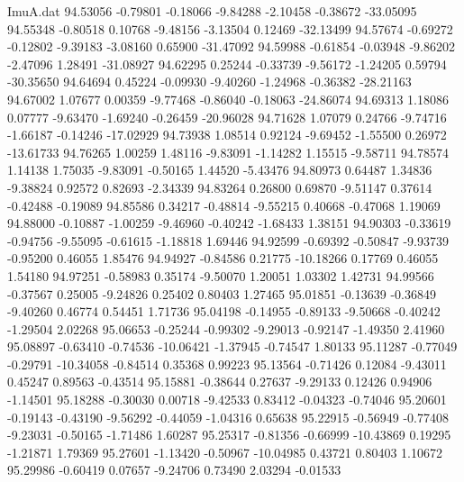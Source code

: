 \begin{filecontents}{ImuA.dat}
  94.53056   -0.79801   -0.18066   -9.84288   -2.10458   -0.38672  -33.05095
  94.55348   -0.80518    0.10768   -9.48156   -3.13504    0.12469  -32.13499
  94.57674   -0.69272   -0.12802   -9.39183   -3.08160    0.65900  -31.47092
  94.59988   -0.61854   -0.03948   -9.86202   -2.47096    1.28491  -31.08927
  94.62295    0.25244   -0.33739   -9.56172   -1.24205    0.59794  -30.35650
  94.64694    0.45224   -0.09930   -9.40260   -1.24968   -0.36382  -28.21163
  94.67002    1.07677    0.00359   -9.77468   -0.86040   -0.18063  -24.86074
  94.69313    1.18086    0.07777   -9.63470   -1.69240   -0.26459  -20.96028
  94.71628    1.07079    0.24766   -9.74716   -1.66187   -0.14246  -17.02929
  94.73938    1.08514    0.92124   -9.69452   -1.55500    0.26972  -13.61733
  94.76265    1.00259    1.48116   -9.83091   -1.14282    1.15515   -9.58711
  94.78574    1.14138    1.75035   -9.83091   -0.50165    1.44520   -5.43476
  94.80973    0.64487    1.34836   -9.38824    0.92572    0.82693   -2.34339
  94.83264    0.26800    0.69870   -9.51147    0.37614   -0.42488   -0.19089
  94.85586    0.34217   -0.48814   -9.55215    0.40668   -0.47068    1.19069
  94.88000   -0.10887   -1.00259   -9.46960   -0.40242   -1.68433    1.38151
  94.90303   -0.33619   -0.94756   -9.55095   -0.61615   -1.18818    1.69446
  94.92599   -0.69392   -0.50847   -9.93739   -0.95200    0.46055    1.85476
  94.94927   -0.84586    0.21775  -10.18266    0.17769    0.46055    1.54180
  94.97251   -0.58983    0.35174   -9.50070    1.20051    1.03302    1.42731
  94.99566   -0.37567    0.25005   -9.24826    0.25402    0.80403    1.27465
  95.01851   -0.13639   -0.36849   -9.40260    0.46774    0.54451    1.71736
  95.04198   -0.14955   -0.89133   -9.50668   -0.40242   -1.29504    2.02268
  95.06653   -0.25244   -0.99302   -9.29013   -0.92147   -1.49350    2.41960
  95.08897   -0.63410   -0.74536  -10.06421   -1.37945   -0.74547    1.80133
  95.11287   -0.77049   -0.29791  -10.34058   -0.84514    0.35368    0.99223
  95.13564   -0.71426    0.12084   -9.43011    0.45247    0.89563   -0.43514
  95.15881   -0.38644    0.27637   -9.29133    0.12426    0.94906   -1.14501
  95.18288   -0.30030    0.00718   -9.42533    0.83412   -0.04323   -0.74046
  95.20601   -0.19143   -0.43190   -9.56292   -0.44059   -1.04316    0.65638
  95.22915   -0.56949   -0.77408   -9.23031   -0.50165   -1.71486    1.60287
  95.25317   -0.81356   -0.66999  -10.43869    0.19295   -1.21871    1.79369
  95.27601   -1.13420   -0.50967  -10.04985    0.43721    0.80403    1.10672
  95.29986   -0.60419    0.07657   -9.24706    0.73490    2.03294   -0.01533

\end{filecontents}
